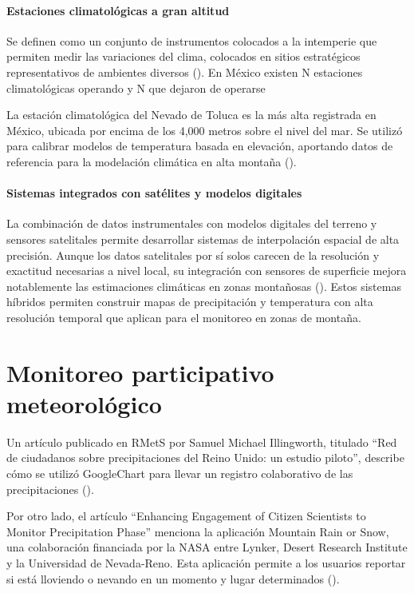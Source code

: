 \paragraph{Estaciones climatológicas a gran altitud}
Se definen como un conjunto de instrumentos colocados a la intemperie que permiten medir las variaciones del clima, colocados en sitios estratégicos representativos de ambientes diversos (\cite{conagua_estaciones_climatologicas_2013}).
En México existen N estaciones climatológicas operando y N que dejaron de operarse

La estación climatológica del Nevado de Toluca es la más alta registrada en México, ubicada por encima de los 4,000 metros sobre el nivel del mar. Se utilizó para calibrar modelos de temperatura basada en elevación, aportando datos de referencia para la modelación climática en alta montaña  (\cite{soto_delgado_2020}).

\paragraph{Sistemas integrados con satélites y modelos digitales}

La combinación de datos instrumentales con modelos digitales del terreno y sensores satelitales permite desarrollar sistemas de interpolación espacial de alta precisión. Aunque los datos satelitales por sí solos carecen de la resolución y exactitud necesarias a nivel local, su integración con sensores de superficie mejora notablemente las estimaciones climáticas en zonas montañosas  (\cite{lei2022combining}). Estos sistemas híbridos permiten construir mapas de precipitación y temperatura con alta resolución temporal que aplican para el monitoreo en zonas de montaña.



\section{Monitoreo participativo meteorológico}


Un artículo publicado en RMetS por Samuel Michael Illingworth, titulado ``Red de ciudadanos sobre precipitaciones del Reino Unido: un estudio piloto'', describe cómo se utilizó GoogleChart para llevar un registro colaborativo de las precipitaciones (\cite{illingworth2021ukprecipitation}).

Por otro lado, el artículo ``Enhancing Engagement of Citizen Scientists to Monitor Precipitation Phase'' menciona la aplicación Mountain Rain or Snow, una colaboración financiada por la NASA entre Lynker, Desert Research Institute y la Universidad de Nevada-Reno. Esta aplicación permite a los usuarios reportar si está lloviendo o nevando en un momento y lugar determinados (\cite{lute2021enhancing}).


